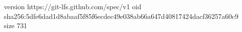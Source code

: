 version https://git-lfs.github.com/spec/v1
oid sha256:5dfe6dad1d8abaaf5f85f6ecdec49e038ab66a647d40817424dacf36257a60c9
size 731
